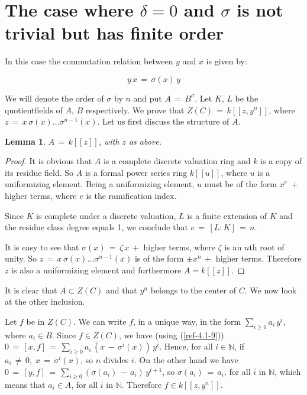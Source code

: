 \documentclass{amsart}
\numberwithin{equation}{section}
\let\blb\mathbb
\def \NN{{\blb N}}
\newtheorem{lemma}{Lemma}[section]
\theoremstyle{definition}
\theoremstyle{remark}
\begin{document}
\section{The case where $\delta =0$ and $\sigma$ is not trivial but has finite order} \label{ref-4-8}
In this case the commutation relation between $y$ and $x$ is given by:

\begin{equation} \label{ref-4.1-9}
    y\,x\,=\,\sigma(x)\,y
\end{equation}

We will denote the order of $\sigma$ by $n$ and put 
$A\,=\,B^{\sigma}$. Let $K$, $L$ be the quotientfields of $A$, $B$ 
respectively.
We  prove that $Z(C)\,=\,k[[z,y^{n}]]$, where 
$z\,=\,x\,\sigma(x) \ldots \sigma^{n-1}(x)$.
Let us first discuss the structure of $A$.

\begin{lemma} \label{ref-4.1-10}
    $A\,=\,k[[z]]$, with $z$ as above.
\end{lemma}

\begin{proof}
    It is obvious that $A$ is a complete discrete valuation ring and 
    $k$ is a copy of its residue field. So $A$ is a formal power 
    series ring $k[[u]]$, where $u$ is a uniformizing element. Being 
    a uniformizing element, $u$ must be of the form 
    $x^{e}\;+$ higher terms, where $e$ is the ramification index.
   
Since $K$ is complete under a discrete valuation, $L$ is 
    a finite extension of $K$ and the residue class degree equals 1, 
    we conclude that $e\,=\,[L:K]\,=\,n$.
    
It is easy to see that $\sigma(x)\,=\,\zeta\,x\,+$ higher 
    terms, where $\zeta$ is an $n$th root of unity. So 
    $z\,=\,x\,\sigma(x) \ldots \sigma^{n-1}(x)$ is of the form 
    $\pm x^{n}\,+$ higher terms. Therefore $z$ is also a uniformizing 
    element and furthermore $A=k[[z]]$.
\end{proof}

It is clear that $A \subset Z(C)$ and that $y^{n}$ belongs to the 
center of $C$.
We now look at the other inclusion.

 Let $f$ be in $Z(C)$. We can write $f$, in a unique way, in 
the form $\displaystyle{\sum_{i \geq 0}a_{i}\,y^{i}}$, where $a_{i} 
\in B$.
 Since $f \in Z(C)$, we have (using (\ref{ref-4.1-9})) $0\,=\,[x,f]\,=\, 
\displaystyle{\sum_{i \geq 0} a_{i}\,(x\,-\,\sigma^{i}(x))\,y^{i}}$. 
Hence, for all $i \in \NN$, if $a_{i} \,\neq\, 0, \; 
x\,=\,\sigma^{i}(x)$, so $n$ divides $i$. On the other hand we have 
$0\,=\,[y,f]\,=\, \displaystyle{\sum_{i \geq 0}(\sigma(a_{i}) \,-\, 
a_{i}) \,y^{i+1}}$, so $\sigma(a_{i})\,=\,a_{i}$, for all $i$ in 
$\NN$, which means that $a_{i} \in A$, for all $i$ in $\NN$.
Therefore $f \in k[[z,y^{n}]]$.
\end{document}
